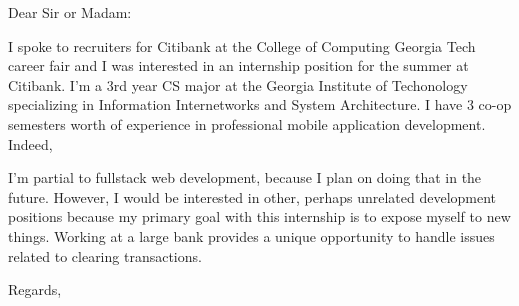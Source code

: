 \documentclass{letter}
\begin{document}
\begin{letter}{}
\opening{Dear Sir or Madam:}

I spoke to recruiters for Citibank at the College of Computing Georgia Tech career fair and I was interested in an internship position for the summer at Citibank. I'm a 3rd year CS major at the Georgia Institute of Techonology specializing in Information Internetworks and System Architecture. I have 3 co-op semesters worth of experience in professional mobile application development. Indeed, 


I'm partial to fullstack web development, because I plan on doing that in the future. However, I would be interested in other, perhaps unrelated development positions because my primary goal with this internship is to expose myself to new things. Working at a large bank provides a unique opportunity to handle issues related to clearing transactions.




\closing{Regards,}
\end{letter}
\end{document}
